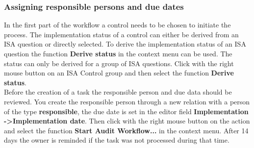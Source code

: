 \documentclass[a4paper,10pt]{book}
\begin{document}
\subsubsection{Assigning responsible persons and due dates}
In the first part of the workflow a control needs to be chosen to initiate the process. The implementation status of a control can either be derived from an ISA question or directly selected. To derive the implementation status of an ISA question the function \textbf{Derive status} in the context menu can be used. The status can only be derived for a group of ISA questions. Click with the right mouse button on an ISA Control group and then select the function  \textbf{Derive status}.
\newline\\
Before the creation of a task the responsible person and due data should be reviewed. You create the responsible person through a new relation with a person of the type \textbf{responsible}, the due date is set in the editor field \textbf{Implementation -\textgreater Implementation date}. Then click with the right mouse button on the action and select the function \textbf{Start Audit Workflow...} in the context menu.
After 14 days the owner is reminded if the task was not processed during that time.
\end{document}
